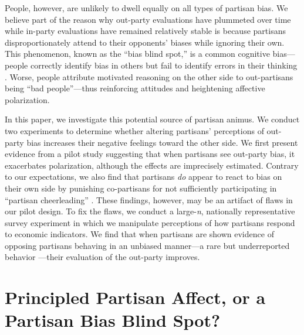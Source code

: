 \documentclass[12pt, letterpaper]{article}
\begin{document}
People, however, are unlikely to dwell equally on all types of partisan bias. We believe part of the reason why out-party evaluations have plummeted over time while in-party evaluations have remained relatively stable \citep{IyengarSoodLelkes2012,Hetherington2009} is because partisans disproportionately attend to their opponents' biases while ignoring their own. This phenomenon, known as the ``bias blind spot,'' is a common cognitive bias---people correctly identify bias in others but fail to identify errors in their thinking \citep{proninetal_2002,pronin_2007}. Worse, people attribute motivated reasoning on the other side to out-partisans being ``bad people''---thus reinforcing attitudes and heightening affective polarization.

In this paper, we investigate this potential source of partisan animus. We conduct two experiments to determine whether altering partisans' perceptions of out-party bias increases their negative feelings toward the other side. We first present evidence from a pilot study suggesting that when partisans see out-party bias, it exacerbates polarization, although the effects are imprecisely estimated. Contrary to our expectations, we also find that partisans \textit{do} appear to react to bias on their own side by punishing co-partisans for not sufficiently participating in ``partisan cheerleading'' \citep{bullocketal_2015}. These findings, however, may be an artifact of flaws in our pilot design. To fix the flaws, we conduct a large-\textit{n}, nationally representative survey experiment in which we manipulate perceptions of how partisans respond to economic indicators. We find that when partisans are shown evidence of opposing partisans behaving in an unbiased manner---a rare but underreported behavior \citep{luskin2018misinformation}---their evaluation of the out-party improves.

\section*{Principled Partisan Affect, or a Partisan Bias Blind Spot?}
\end{document}
